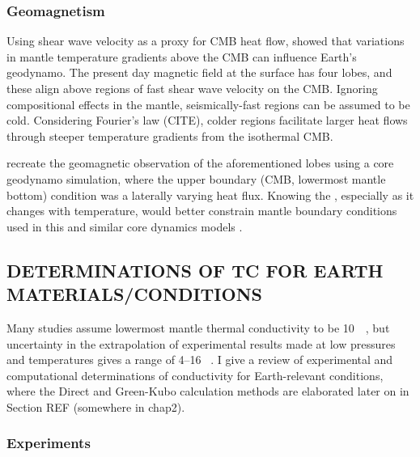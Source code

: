 \subsubsection{Geomagnetism}

Using shear wave velocity as a proxy for CMB heat flow, \citet{Gubbins2007} showed that variations in mantle temperature gradients above the CMB can influence Earth's geodynamo. The present day magnetic field at the surface has four lobes, and these align above regions of fast shear wave velocity on the CMB. Ignoring compositional effects in the mantle, seismically-fast regions can be assumed to be cold. Considering Fourier's law (CITE), colder regions facilitate larger heat flows through steeper temperature gradients from the isothermal CMB.

\citet{Gubbins2007} recreate the geomagnetic observation of the aforementioned lobes using a core geodynamo simulation, where the upper boundary (CMB, lowermost mantle bottom) condition was a laterally varying heat flux. Knowing the \tc, especially as it changes with temperature, would better constrain mantle boundary conditions used in this and similar core dynamics models \citep{Ammann2014}.




\subsection{DETERMINATIONS OF TC FOR EARTH MATERIALS/CONDITIONS}
Many studies assume lowermost mantle thermal conductivity to be 10~\wmk~\citep[e.g.][]{Lay2008}, but uncertainty in the extrapolation of experimental results made at low pressures and temperatures gives a range of 4--16 \wmk~\citep{Brown1986, Osako1991, Hofmeister1999, Goncharov2009, Manthilake2011, Ohta2012}. I give a review of experimental and computational determinations of conductivity for Earth-relevant conditions, where the Direct and Green-Kubo calculation methods are elaborated later on in Section REF (somewhere in chap2).

\subsubsection{Experiments}

